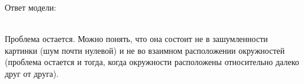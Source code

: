 \documentclass[12pt,twoside]{article}
\begin{document}
Ответ модели: \\
\begin{figure}[h]
\end{figure}\\
Проблема остается. Можно понять, что она состоит не в зашумленности картинки (шум почти нулевой) и не во взаимном расположении окружностей (проблема остается и тогда, когда окружности расположены относительно далеко друг от друга). \newpage
\end{document}

